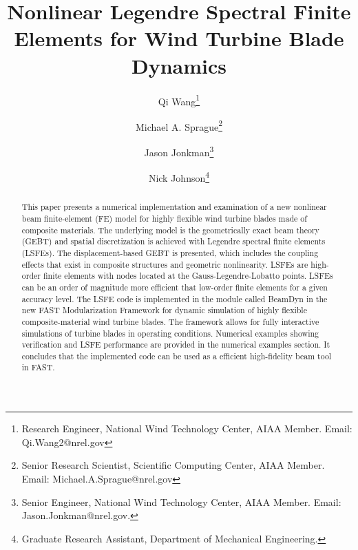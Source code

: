 \documentclass{aiaa-tc}
\title{Nonlinear Legendre Spectral Finite Elements for Wind Turbine Blade Dynamics}
\author[1]{Qi Wang\thanks{Research Engineer, National Wind Technology Center, AIAA Member. Email: Qi.Wang2@nrel.gov}}
\author[1]{Michael A. Sprague\thanks{Senior Research Scientist, Scientific
Computing Center, AIAA Member. Email: Michael.A.Sprague@nrel.gov}}
\author[1]{Jason Jonkman\thanks{Senior Engineer, National Wind Technology
Center, AIAA Member. Email: Jason.Jonkman@nrel.gov.}}
\author[2]{Nick Johnson\thanks{Graduate Research Assistant, Department of
Mechanical Engineering.}}
\affil[1]{National Renewable Energy Laboratory, Golden, CO 80401}
\affil[2]{Colorado School of Mines, Golden, CO 80401}
\renewcommand{\kill}[1]{\textcolor{red}{\sout{#1}}}
\begin{document}
\maketitle

\begin{abstract}
This paper presents a numerical implementation and examination of a new
nonlinear beam finite-element (FE) model for highly flexible wind turbine
blades made of composite materials.  The underlying model is the
geometrically exact beam theory (GEBT) and spatial discretization is
achieved with  Legendre spectral finite elements (LSFEs).  The
displacement-based GEBT is presented, which includes the coupling effects
that exist in composite structures and geometric nonlinearity.   LSFEs are
high-order finite elements with nodes located at the Gauss-Legendre-Lobatto
points.  LSFEs can be an order of magnitude more efficient that low-order
finite elements for a given accuracy level.    The LSFE code is implemented
in the module called BeamDyn in the new FAST Modularization Framework for
dynamic simulation of highly flexible composite-material wind turbine
blades.  The framework allows for fully interactive simulations of turbine
blades in operating conditions.  Numerical examples showing verification and
LSFE performance are provided in the numerical examples section. It
concludes that the implemented code can be used as a efficient high-fidelity
beam tool in FAST.
\end{abstract}


\end{document}
